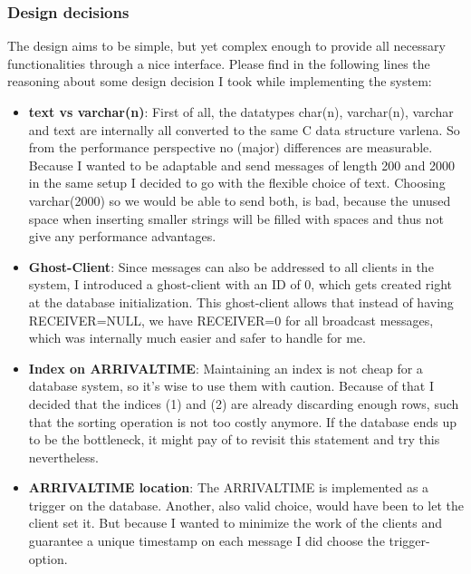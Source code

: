 \documentclass[11pt]{article}
\begin{document}
\subsubsection{Design decisions}\label{sec:design-decisions}
The design aims to be simple, but yet complex enough to provide all necessary functionalities through a nice interface. Please find in the following lines the reasoning about some design decision I took while implementing the system:
\begin{itemize}
	\item \textbf{text vs varchar(n)}: First of all, the datatypes char(n), varchar(n), varchar and text are internally all converted to the same C data structure varlena. So from the performance perspective no (major) differences are measurable. Because I wanted to be adaptable and send messages of length 200 and 2000 in the same setup I decided to go with the flexible choice of text. Choosing varchar(2000) so we would be able to send both, is bad, because the unused space when inserting smaller strings will be filled with spaces and thus not give any performance advantages.
	\item \textbf{Ghost-Client}: Since messages can also be addressed to all clients in the system, I introduced a ghost-client with an ID of 0, which gets created right at the database initialization. This ghost-client allows that instead of having RECEIVER=NULL, we have RECEIVER=0 for all broadcast messages, which was internally much easier and safer to handle for me.
	\item \textbf{Index on ARRIVALTIME}: Maintaining an index is not cheap for a database system, so it's wise to use them with caution. Because of that I decided that the indices (1) and (2) are already discarding enough rows, such that the sorting operation is not too costly anymore. If the database ends up to be the bottleneck, it might pay of to revisit this statement and try this nevertheless.
	\item \textbf{ARRIVALTIME location}: The ARRIVALTIME is implemented as a trigger on the database. Another, also valid choice, would have been to let the client set it. But because I wanted to minimize the work of the clients and guarantee a unique timestamp on each message I did choose the trigger-option.
\end{itemize}
\end{document}
